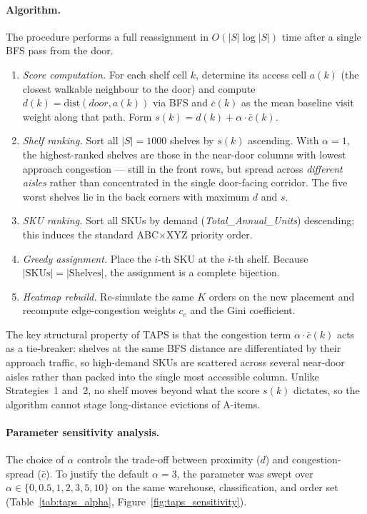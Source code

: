 \documentclass[12pt,a4paper]{article}
\begin{document}
\paragraph{Algorithm.}
The procedure performs a full reassignment in $O(|S| \log |S|)$ time after a single
BFS pass from the door.
\begin{enumerate}
  \item \emph{Score computation.}
        For each shelf cell $k$, determine its access cell $a(k)$ (the closest
        walkable neighbour to the door) and compute $d(k) = \mathrm{dist}(door, a(k))$
        via BFS and $\bar{c}(k)$ as the mean baseline visit weight along that path.
        Form $s(k) = d(k) + \alpha \cdot \bar{c}(k)$.
  \item \emph{Shelf ranking.}
        Sort all $|S|=1000$ shelves by $s(k)$ ascending.
        With $\alpha = 1$, the highest-ranked shelves are those in the
        near-door columns with lowest approach congestion --- still in the
        front rows, but spread across \emph{different aisles} rather than
        concentrated in the single door-facing corridor.
        The five worst shelves lie in the back corners with maximum $d$ and $s$.
  \item \emph{SKU ranking.}
        Sort all SKUs by demand (\textit{Total\_Annual\_Units}) descending; this
        induces the standard ABC$\times$XYZ priority order.
  \item \emph{Greedy assignment.}
        Place the $i$-th SKU at the $i$-th shelf.
        Because $|\mathrm{SKUs}| = |\mathrm{Shelves}|$, the assignment is a
        complete bijection.
  \item \emph{Heatmap rebuild.}
        Re-simulate the same $K$ orders on the new placement and recompute
        edge-congestion weights $c_e$ and the Gini coefficient.
\end{enumerate}
The key structural property of TAPS is that the congestion term
$\alpha \cdot \bar{c}(k)$ acts as a tie-breaker: shelves at the same BFS distance
are differentiated by their approach traffic, so high-demand SKUs are scattered
across several near-door aisles rather than packed into the single most accessible
column.
Unlike Strategies~1 and~2, no shelf moves beyond what the score $s(k)$ dictates,
so the algorithm cannot stage long-distance evictions of A-items.

\paragraph{Parameter sensitivity analysis.}
The choice of $\alpha$ controls the trade-off between proximity ($d$) and
congestion-spread ($\bar c$).
To justify the default $\alpha = 3$, the parameter was swept over
$\alpha \in \{0, 0.5, 1, 2, 3, 5, 10\}$ on the same warehouse, classification,
and order set (Table~\ref{tab:taps_alpha}, Figure~\ref{fig:taps_sensitivity}).
\end{document}
